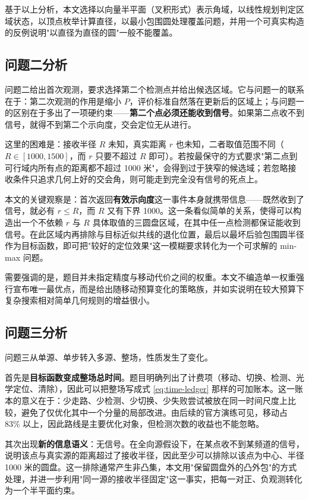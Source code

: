 基于以上分析，本文选择以向量半平面（叉积形式）表示角域，以线性规划判定区域状态，以顶点枚举计算直径，以最小包围圆处理覆盖问题，并用一个可真实构造的反例说明"以直径为直径的圆"一般不能覆盖。

\subsection{问题二分析}

问题二给出首次观测，要求选择第二个检测点并给出候选区域。它与问题一的联系在于：第二次观测的作用是缩小 $P$，评价标准自然落在更新后的区域上；与问题一的区别在于多出了一项硬约束——\textbf{第二个点必须还能收到信号}。如果第二点收不到信号，就得不到第二个示向度，交会定位无从进行。

这里的困难是：接收半径 $R$ 未知，真实距离 $r$ 也未知，二者取值范围不同（$R\in[1000,1500]$，而 $r$ 只要不超过 $R$ 即可）。若按最保守的方式要求"第二点到可行域内所有点的距离都不超过 1000 米"，会得到过于狭窄的候选域；若忽略接收条件只追求几何上好的交会角，则可能走到完全没有信号的死点上。

本文的关键观察是：首次返回\textbf{有效示向度}这一事件本身就携带信息——既然收到了信号，就必有 $r\le R$，而 $R$ 又有下界 1000。这一条看似简单的关系，使得可以构造出一个不依赖 $r$ 与 $R$ 具体取值的三圆盘区域，在其中任一点检测都保证能收到信号。在此区域内再排除与目标近似共线的退化位置，最后以最坏后验包围圆半径作为目标函数，即可把"较好的定位效果"这一模糊要求转化为一个可求解的 min-max 问题。

需要强调的是，题目并未指定精度与移动代价之间的权重。本文不编造单一权重强行宣布唯一最优点，而是给出随移动预算变化的策略族，并如实说明在较大预算下复杂搜索相对简单几何规则的增益很小。

\subsection{问题三分析}

问题三从单源、单步转入多源、整场，性质发生了变化。

首先是\textbf{目标函数变成整场总时间}。题目明确列出了计费项（移动、切换、检测、光学定位、清除），因此可以把整场写成式 \eqref{eq:time-ledger} 那样的可加账本。这一账本的意义在于：少走路、少检测、少切换、少失败尝试被放在同一时间尺度上比较，避免了仅优化其中一个分量的局部改进。由后续的官方演练可见，移动占 83\% 以上，因此路线是主要优化对象，但检测次数的收益也不能忽略。

其次出现\textbf{新的信息语义}：无信号。在全向源假设下，在某点收不到某频道的信号，说明该点与真实源的距离超过了接收半径，因此至少可以排除以该点为中心、半径 1000 米的圆盘。这一排除通常产生非凸集，本文用"保留圆盘外的凸外包"的方式处理，并进一步利用"同一源的接收半径固定"这一事实，把每一对正、负观测转化为一个半平面约束。

